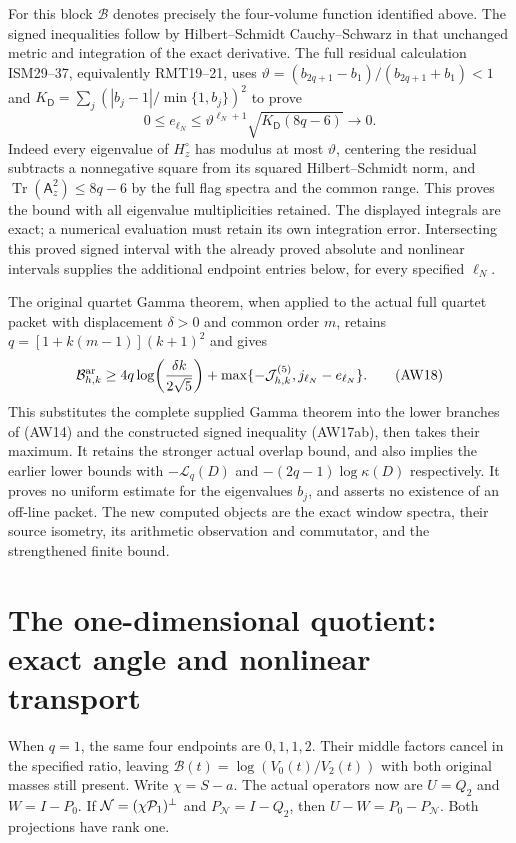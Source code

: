 For this block $\mathcal B$ denotes precisely the four-volume
function identified above. The signed inequalities follow by
Hilbert--Schmidt Cauchy--Schwarz in that unchanged metric and
integration of the exact derivative.
The full residual calculation ISM29--37, equivalently RMT19--21,
uses
$\vartheta=(b_{2q+1}-b_1)/(b_{2q+1}+b_1)<1$ and
$K_{\mathsf D}=\sum_j(|b_j-1|/\min\{1,b_j\})^2$ to prove
\[
 0\le e_{\ell_N}\le
    \vartheta^{\ell_N+1}\sqrt{K_{\mathsf D}(8q-6)}
       \longrightarrow0.
 \tag{AW17ac}
\]
Indeed every eigenvalue of $H_z^\circ$ has modulus at most
$\vartheta$, centering the residual subtracts a nonnegative square
from its squared Hilbert--Schmidt norm, and
$\operatorname{Tr}(\mathsf A_z^2)\le8q-6$ by the full flag spectra
and the common range. This proves the bound with all eigenvalue
multiplicities retained. The displayed integrals are exact; a
numerical evaluation must retain its own integration error.
Intersecting this proved signed interval with the already proved
absolute and nonlinear intervals supplies the additional endpoint
entries below, for every specified $\ell_N$.

The original quartet Gamma theorem, when applied to the actual
full quartet packet with displacement $\delta>0$ and common
order $m$, retains $q=[1+k(m-1)](k+1)^2$ and gives
\[
 \mathcal B^{\rm ar}_{h,k}
 \ge4q\log\!\left(\frac{\delta k}{2\sqrt5}\right)
             +\max\{-\mathcal J_{h,k}^{(5)},j_{\ell_N}-e_{\ell_N}\}.
 \tag{AW18}
\]
This substitutes the complete supplied Gamma theorem into the
lower branches of (AW14) and the constructed signed inequality (AW17ab),
then takes their maximum. It retains the stronger
actual overlap bound, and also implies the earlier lower bounds with
$-\mathcal L_q(D)$ and $-(2q-1)\log\kappa(D)$ respectively. It proves no
uniform estimate for the eigenvalues $b_j$, and asserts no
existence of an off-line packet. The new computed objects are
the exact window spectra, their source isometry, its arithmetic
observation and commutator, and the strengthened finite bound.

\section[The one-dimensional quotient: exact angle and nonlinear transport]{The one-dimensional quotient:\\exact angle and nonlinear transport}

When $q=1$, the same four endpoints are $0,1,1,2$. Their
middle factors cancel in the specified ratio, leaving
$\mathcal B(t)=\log(V_0(t)/V_2(t))$ with both original masses
still present. Write $\chi=S-a$. The actual operators now are
$U=Q_2$ and $W=I-P_0$. If $\mathcal N=(\chi\mathcal P_1)^\perp$
and $P_{\mathcal N}=I-Q_2$, then
$U-W=P_0-P_{\mathcal N}$. Both projections have rank one.

